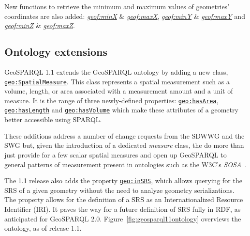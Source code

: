 \documentclass[runningheads]{llncs}
\begin{document}
New functions to retrieve the minimum and maximum values of geometries' coordinates are also added: \href{http://www.opengis.net/def/function/geosparql/minX}{\emph{geof:minX}} \& \href{http://www.opengis.net/def/function/geosparql/maxX}{\emph{geof:maxX}},
\href{http://www.opengis.net/def/function/geosparql/minY}{\emph{geof:minY}} \& \href{http://www.opengis.net/def/function/geosparql/maxY}{\emph{geof:maxY}} and \href{http://www.opengis.net/def/function/geosparql/minZ}{\emph{geof:minZ}} \& \href{http://www.opengis.net/def/function/geosparql/maxZ}{\emph{geof:maxZ}}.

\subsection{Ontology extensions}\label{sec:ontexts}
GeoSPARQL 1.1 extends the GeoSPARQL ontology by adding a new class, \href{http://www.opengis.net/ont/geosparql#SpatialMeasure}{\texttt{geo:SpatialMeasure}}. This class represents a spatial measurement 
such as a volume, length, or area associated with a measurement amount and a unit of measure. It is the range of three newly-defined properties:
\href{http://www.opengis.net/ont/geosparql#hasArea}{\texttt{geo:hasArea}}, \href{http://www.opengis.net/ont/geosparql#hasLength}{\texttt{geo:hasLength}} and \href{http://www.opengis.net/ont/geosparql#hasVolume}{\texttt{geo:hasVolume}} which make these attributes of a geometry better accessible using 
SPARQL. 

These additions address a number of change requests from the SDWWG and the SWG but, given the introduction of a dedicated \textit{measure} class, 
the do more than just provide for a few scalar spatial measures and open up GeoSPARQL to general patterns of measurement present in ontologies 
such as the W3C's \textit{SOSA}~\cite{haller_semantic_2017}.

The 1.1 release also adds the property \href{http://www.opengis.net/def/function/geosparql/inSRS}{\texttt{geo:inSRS}}, which allows querying for the SRS of a given geometry without the need to analyze 
geometry serializations. The property allows for the definition of a SRS as an Internationalized Resource Identifier (IRI). It paves the way 
for a future definition of SRS fully in RDF, as anticipated for GeoSPARQL 2.0. Figure~\ref{fig:geosparql11ontology} overviews the ontology, as 
of release 1.1.
\end{document}
